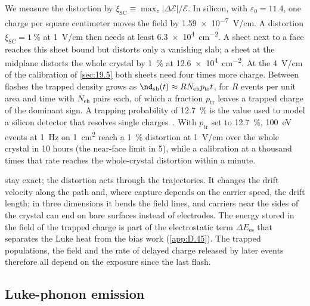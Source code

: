 We measure the distortion by $\xi_{\mathrm{SC}} \equiv \max_z|\Delta\mathcal{E}|/\mathcal{E}$. In silicon, with $\varepsilon_0 = 11.4$, one charge per square centimeter moves the field by \SI{1.59e-7}{V/cm}. A distortion $\xi_{\mathrm{SC}} = \SI{1}{\percent}$ at \SI{1}{V/cm} then needs at least \SI{6.3e4}{cm^{-2}}. A sheet next to a face reaches this sheet bound but distorts only a vanishing slab; a sheet at the midplane distorts the whole crystal by \SI{1}{\percent} at \SI{12.6e4}{cm^{-2}}. At the \SI{4}{V/cm} of the calibration of \cref{sec:19.5} both sheets need four times more charge. Between flashes the trapped density grows as $\nd_{\mathrm{sh}}(t) \approx R\bar N_{\mathrm{eh}}p_{\mathrm{tr}}t$, for $R$ events per unit area and time with $\bar N_{\mathrm{eh}}$ pairs each, of which a fraction $p_{\mathrm{tr}}$ leaves a trapped charge of the dominant sign. A trapping probability of \SI{12.7}{\percent} is the value used to model a silicon detector that resolves single charges~\cite{albakry2023first}. With $p_{\mathrm{tr}}$ set to \SI{12.7}{\percent}, \SI{100}{eV} events at \SI{1}{Hz} on \SI{1}{cm^2} reach a \SI{1}{\percent} distortion at \SI{1}{V/cm} over the whole crystal in 10 hours (the near-face limit in 5), while a calibration at a thousand times that rate reaches the whole-crystal distortion within a minute.

 stay exact; the distortion acts through the trajectories. It changes the drift velocity along the path and, where capture depends on the carrier speed, the drift length; in three dimensions it bends the field lines, and carriers near the sides of the crystal can end on bare surfaces instead of electrodes. The energy stored in the field of the trapped charge is part of the electrostatic term $\Delta E_{\mathrm{es}}$ that separates the Luke heat from the bias work (\cref{app:D.45}). The trapped populations, the field and the rate of delayed charge released by later events therefore all depend on the exposure since the last flash.

\subsection{Luke-phonon emission}\label{sec:20.1-luke}

